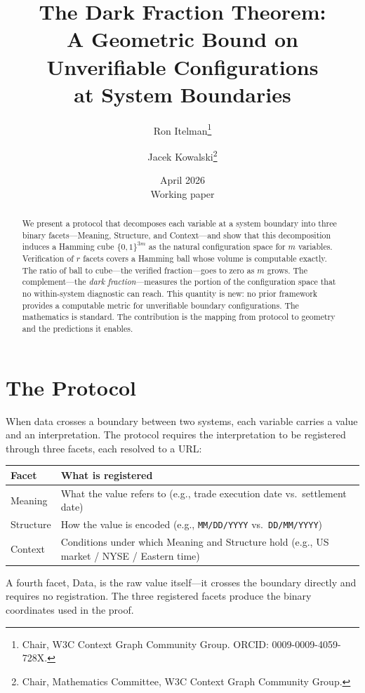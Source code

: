 \documentclass[11pt,a4paper]{article}
\title{The Dark Fraction Theorem:\\A Geometric Bound on Unverifiable Configurations\\at System Boundaries}
\author{Ron Itelman\thanks{Chair, W3C Context Graph Community Group. ORCID: 0009-0009-4059-728X.} \and Jacek Kowalski\thanks{Chair, Mathematics Committee, W3C Context Graph Community Group.}}
\date{April 2026\\Working paper}
\begin{document}
\maketitle

\begin{abstract}
We present a protocol that decomposes each variable at a system boundary into three binary facets---Meaning, Structure, and Context---and show that this decomposition induces a Hamming cube $\{0,1\}^{3m}$ as the natural configuration space for $m$ variables. Verification of $r$ facets covers a Hamming ball whose volume is computable exactly. The ratio of ball to cube---the verified fraction---goes to zero as $m$ grows. The complement---the \emph{dark fraction}---measures the portion of the configuration space that no within-system diagnostic can reach. This quantity is new: no prior framework provides a computable metric for unverifiable boundary configurations. The mathematics is standard. The contribution is the mapping from protocol to geometry and the predictions it enables.
\end{abstract}

\section{The Protocol}
\label{sec:protocol}

When data crosses a boundary between two systems, each variable carries a value and an interpretation. The protocol requires the interpretation to be registered through three facets, each resolved to a URL:

\begin{center}
\begin{tabular}{@{}lp{9cm}@{}}
\toprule
\textbf{Facet} & \textbf{What is registered} \\
\midrule
Meaning & What the value refers to (e.g., trade execution date vs.\ settlement date) \\
Structure & How the value is encoded (e.g., \texttt{MM/DD/YYYY} vs.\ \texttt{DD/MM/YYYY}) \\
Context & Conditions under which Meaning and Structure hold (e.g., US market / NYSE / Eastern time) \\
\bottomrule
\end{tabular}
\end{center}

\noindent A fourth facet, Data, is the raw value
itself---it crosses the boundary directly and requires
no registration. The three registered facets produce
the binary coordinates used in the proof.
\end{document}
